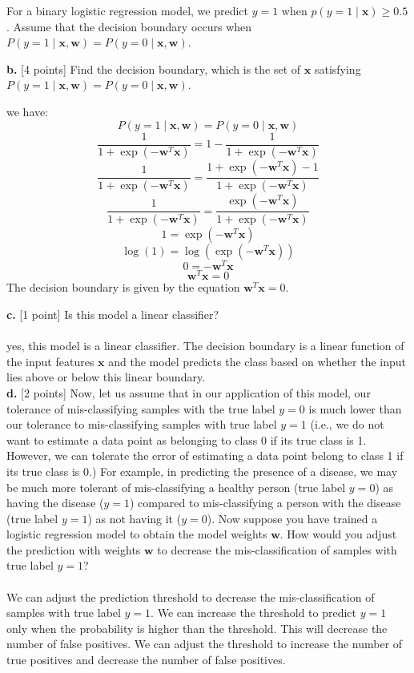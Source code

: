 \documentclass[a3paper,12pt]{extarticle} %
\begin{document}
For a binary logistic regression model, we predict \( y = 1 \) when \( p(y = 1 \mid \mathbf{x}) \geq 0.5 \). Assume that the decision boundary occurs when \( P(y = 1 \mid \mathbf{x}, \mathbf{w}) = P(y = 0 \mid \mathbf{x}, \mathbf{w}) \).

\noindent \textbf{b.} [4 points] Find the decision boundary, which is the set of $\mathbf{x}$ satisfying $P(y = 1 \mid \mathbf{x}, \mathbf{w}) = P(y = 0 \mid \mathbf{x}, \mathbf{w})$.

we have:
\[
P(y = 1 \mid \mathbf{x}, \mathbf{w}) = P(y = 0 \mid \mathbf{x}, \mathbf{w})
\]
\[
\frac{1}{1 + \exp(-\mathbf{w}^T \mathbf{x})} = 1 - \frac{1}{1 + \exp(-\mathbf{w}^T \mathbf{x})}
\]
\[
\frac{1}{1 + \exp(-\mathbf{w}^T \mathbf{x})} = \frac{1 + \exp(-\mathbf{w}^T \mathbf{x}) - 1}{1 + \exp(-\mathbf{w}^T \mathbf{x})}
\]
\[
\frac{1}{1 + \exp(-\mathbf{w}^T \mathbf{x})} = \frac{\exp(-\mathbf{w}^T \mathbf{x})}{1 + \exp(-\mathbf{w}^T \mathbf{x})}
\]
\[
1 = \exp(-\mathbf{w}^T \mathbf{x})
\]
\[
\log(1) = \log(\exp(-\mathbf{w}^T \mathbf{x}))
\]
\[
0 = -\mathbf{w}^T \mathbf{x}
\]
\[
\mathbf{w}^T \mathbf{x} = 0
\]
The decision boundary is given by the equation \( \mathbf{w}^T \mathbf{x} = 0 \).

\noindent \textbf{c.} [1 point] Is this model a linear classifier?
\\\\yes, this model is a linear classifier. The decision boundary is a linear function of the input features \( \mathbf{x} \) and the model predicts the class based on whether the input lies above or below this linear boundary.\\

\noindent \textbf{d.} [2 points] Now, let us assume that in our application of this model, our tolerance of mis-classifying samples with the true label $y = 0$ is much lower than our tolerance to mis-classifying samples with true label $y = 1$ (i.e., we do not want to estimate a data point as belonging to class 0 if its true class is 1. However, we can tolerate the error of estimating a data point belong to class 1 if its true class is 0.) For example, in predicting the presence of a disease, we may be much more tolerant of mis-classifying a healthy person (true label $y = 0$) as having the disease ($y = 1$) compared to mis-classifying a person with the disease (true label $y = 1$) as not having it ($y = 0$). Now suppose you have trained a logistic regression model to obtain the model weights $\mathbf{w}$. How would you adjust the prediction with weights $\mathbf{w}$ to decrease the mis-classification of samples with true label $y = 1$?
\\\\We  can adjust the prediction threshold to decrease the mis-classification of samples with true label \( y = 1 \). We can increase the threshold to predict \( y = 1 \) only when the probability is higher than the threshold. This will decrease the number of false positives. We can adjust the threshold to increase the number of true positives and decrease the number of false positives.\\
 
\end{document}
